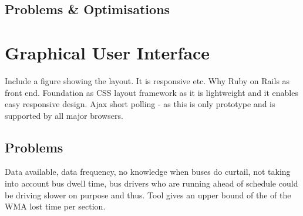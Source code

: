 	\subsection{Problems \& Optimisations}
	
\section{Graphical User Interface}
Include a figure showing the layout. It is responsive etc.
Why Ruby on Rails as front end. Foundation as CSS layout framework as it is lightweight and it enables easy responsive design.
Ajax short polling - as this is only prototype and is supported by all major browsers.


\subsection{Problems}
Data available, data frequency, no knowledge when buses do curtail, not taking into account bus dwell time, bus drivers who are running ahead of schedule could be driving slower on purpose and thus. Tool gives an upper bound of the of the WMA lost time per section. 
